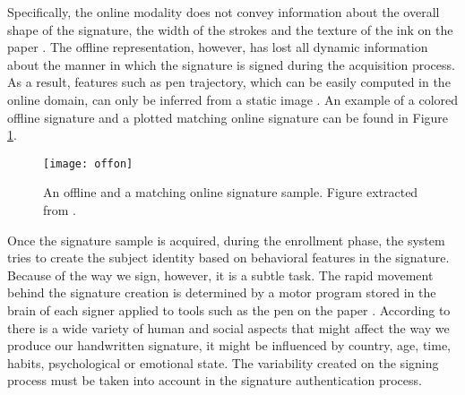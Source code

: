 Specifically, the online modality does not convey information about the overall shape of the signature, the width of the strokes and the texture of the ink on the paper \cite{diaz2014generation}. The offline representation, however, has lost all dynamic information about the manner in which the signature is signed during the acquisition process. As a result, features such as pen trajectory, which can be easily computed in the online domain, can only be inferred from a static image \cite{nel2005estimating}. An example of a colored offline signature and a plotted matching online signature can be found in Figure \ref{fig:offon}. 


\begin{figure}[!htb]
\centering
\texttt{[image: offon]}
\caption{An offline and a matching online signature sample. Figure extracted from \cite{sigcomp2009}.}
\label{fig:offon}
\end{figure}

%

Once the signature sample is acquired, during the enrollment phase, the system tries to create the subject identity based on behavioral features in the signature. Because of the way we sign, however, it is a subtle task. The rapid movement behind the signature creation is determined by a motor program stored in the brain of each signer applied to tools such as the pen on the paper \cite{pirlo2014advances}. According to \cite{plamondon1989automatic} there is a wide variety of human and social aspects that might affect the way we produce our handwritten signature, it might be influenced by country, age, time, habits, psychological or emotional state. The variability created on the signing process must be taken into account in the signature authentication process.

